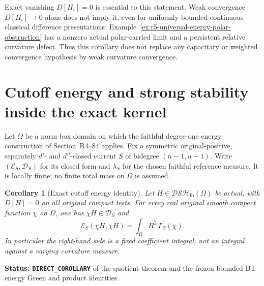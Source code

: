 \documentclass[11pt,a4paper]{article}
\numberwithin{equation}{section}
\newtheorem{corollary}[theorem]{Corollary}
\theoremstyle{definition}
\theoremstyle{remark}
\begin{document}
Exact vanishing $D[H_i]=0$ is essential to this statement.
Weak convergence $D[H_i]\to0$ alone does not imply it, even
for uniformly bounded continuous classical difference
presentations: Example~\ref{ex:r5-universal-energy-polar-obstruction}
has a nonzero actual polar-carried limit and a persistent
relative curvature defect.  Thus this corollary does not
replace any capacitary or weighted convergence hypothesis by
weak curvature convergence.



\section{Cutoff energy and strong stability inside the exact kernel}
\label{sec:r5-exact-kernel-energy}

Let $\Omega$ be a norm-box domain on which the faithful degree-one
energy construction of Section~\textup{R4--84} applies.
Fix a symmetric original-positive, separately $d'$- and
$d''$-closed current $S$ of bidegree $(n-1,n-1)$.  Write
$(\mathcal E_S,\mathscr D_S)$ for its closed form and
$\lambda_S$ for the chosen faithful reference measure.  It is
locally finite; no finite total mass on $\Omega$ is assumed.

\begin{corollary}[Exact cutoff energy identity]
\label{cor:r5-exact-kernel-cutoff-energy}
Let $H\in\mathscr{DSH}_{\mathrm{lb}}(\Omega)$ be actual, with
$D[H]=0$ on all original compact tests.  For every real original
smooth compact function $\chi$ on $\Omega$, one has
$\chi H\in\mathscr D_S$ and
\begin{equation}
        \mathcal E_S(\chi H,\chi H)
                    =\int_\Omega H^2\,\Gamma_S(\chi).
 \label{eq:r5-exact-kernel-cutoff-energy}
\end{equation}
In particular the right-hand side is a fixed coefficient integral,
not an integral against a varying curvature measure.
\end{corollary}

\noindent\textbf{Status: \texttt{DIRECT\_COROLLARY}} of the
quotient theorem and the frozen bounded BT--energy Green and
product identities.
\end{document}
